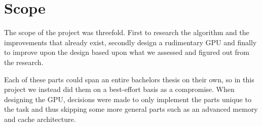 	\section{Scope}
		
		The scope of the project was threefold. First to research the algorithm
		and the improvements that already exist, secondly design a rudimentary 
		GPU and	finally to improve upon the design based upon what we assessed 
		and	figured out from the research.

		Each of these parts could span an entire bachelors thesis on their own, 
		so in this project we instead did them on a best-effort basis as a 
		compromise.	When designing the GPU, decisions were made to only 
		implement the parts unique to the task and thus skipping some more 
		general parts such as an advanced memory and cache architecture.
